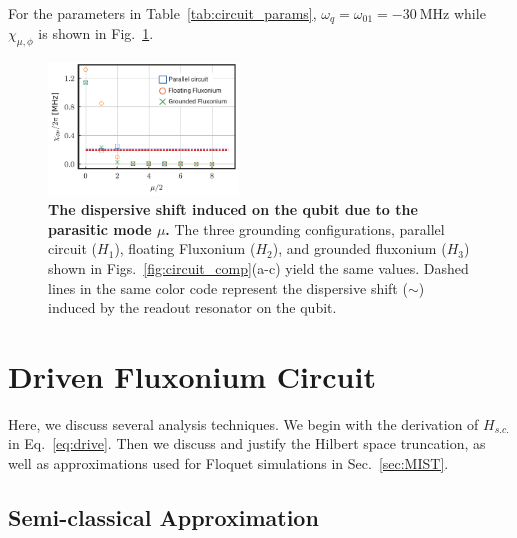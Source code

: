 \documentclass[%
reprint,
superscriptaddress,
 amsmath,amssymb,
 aps,
 prx,
longbibliography,
floatfix,
]{revtex4-2}
\begin{document}
For the parameters in Table~\ref{tab:circuit_params},  $\omega_q=\omega_{01}=-30 \ \mathrm{MHz}$ while $\chi_{\mu,\phi}$ is shown in Fig.~\ref{fig:dispersive-shift}. 
\begin{figure}[htb]
    \centering
    \includegraphics[width=0.45\textwidth]{Supp_Fig/dispersive_shift.pdf}
    \caption{ {\bf The dispersive shift induced on the qubit due to the parasitic mode $\mu$.} The three grounding configurations, parallel circuit ($H_1$), floating Fluxonium ($H_2$), and grounded fluxonium ($H_3$) shown in Figs.~\ref{fig:circuit_comp}(a-c) yield the same values. Dashed lines in the same color code represent the dispersive shift ($\sim $) induced by the readout resonator on the qubit.}
    \label{fig:dispersive-shift}
\end{figure}

\section{Driven Fluxonium Circuit}\label{app:MIST}
Here, we discuss several analysis techniques. We begin with the derivation of $H_{s.c.}$ in Eq.~\ref{eq:drive}. Then we discuss and justify the Hilbert space truncation, as well as approximations used for Floquet simulations in Sec.~\ref{sec:MIST}.
\subsection{Semi-classical Approximation}\label{app:semi-classical}
\end{document}
